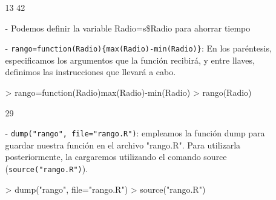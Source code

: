 \documentclass[a4paper, 12pt]{article}
\begin{document}
\begin{itemize}
\begin{itemize}
\begin{Schunk}
\begin{Soutput}
[1] 13 42
\end{Soutput}
\end{Schunk}
			\item[-] Podemos definir la variable Radio=s\$Radio para ahorrar tiempo
\begin{Schunk}
\end{Schunk}
			\item[-] \texttt{rango=function(Radio)\{max(Radio)-min(Radio)\}}: En los paréntesis, especificamos los argumentos que la función recibirá, y entre llaves, definimos las instrucciones que llevará a cabo.
\begin{Schunk}
\begin{Sinput}
> rango=function(Radio){max(Radio)-min(Radio)}
> rango(Radio)
\end{Sinput}
\begin{Soutput}
[1] 29
\end{Soutput}
\end{Schunk}
			\item[-] \texttt{dump("rango", file="rango.R")}: empleamos la función dump para guardar nuestra función en el archivo "rango.R". Para utilizarla posteriormente, la cargaremos utilizando el comando source (\texttt{source("rango.R")}).
\begin{Schunk}
\begin{Sinput}
> dump("rango", file="rango.R")
> source("rango.R")
\end{Sinput}
\end{Schunk}
		\end{itemize}
		\newpage
		

\end{itemize}
\end{document}
